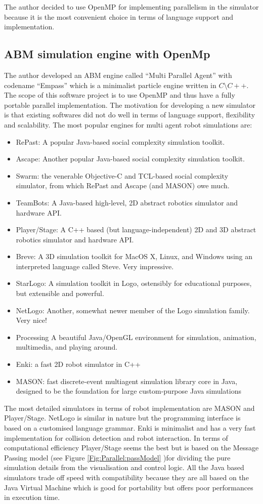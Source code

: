 The author decided to use OpenMP for implementing parallelism in the simulator
because it is the most convenient choice in terms of language support and
implementation.
\subsection{ABM simulation engine with OpenMp}
The author developed an ABM engine called ``Multi Parallel Agent'' with codename
``Empass'' which is a minimalist particle engine written in $C \setminus C++$.
The scope of this software project is to use OpenMP and thus have a fully
portable parallel implementation.
The motivation for developing a new simulator is that existing softwares did not
do well in terms of language support, flexibility and scalability.
The most popular engines for multi agent robot simulations are:

\begin{itemize}
\item RePast: A popular Java-based social complexity simulation toolkit.
\item Ascape: Another popular Java-based social complexity simulation toolkit.
\item Swarm: the venerable Objective-C and TCL-based social complexity simulator,
      from which RePast and Ascape (and MASON) owe much.
\item TeamBots: A Java-based high-level, 2D abstract robotics simulator and
      hardware API.
\item Player/Stage: A C++ based (but language-independent) 2D and 3D abstract
      robotics simulator and hardware API.
\item Breve: A 3D simulation toolkit for MacOS X, Linux, and Windows using
      an interpreted language called Steve. Very impressive.
\item StarLogo: A simulation toolkit in Logo, ostensibly for educational purposes,
      but extensible and powerful.
\item NetLogo: Another, somewhat newer member of the Logo simulation family. Very nice!
\item Processing A beautiful Java/OpenGL environment for simulation, animation,
      multimedia, and playing around.
\item Enki: a fast 2D robot simulator in C++
\item MASON: fast discrete-event multiagent simulation library core in Java,
      designed to be the foundation for large custom-purpose Java simulations
\end{itemize}
The most detailed simulators in terms of robot implementation are MASON and
Player/Stage.
NetLogo is similar in nature but the programming interface is based on a
customised language grammar.
Enki is minimalist and has a very fast implementation for collision detection
and robot interaction.
In terms of computational efficiency Player/Stage seems the best but is based
on the Message Passing model (see Figure \ref{Fig:Parallel:passModel} )for dividing
the pure simulation details from the visualisation and control logic.
All the Java based simulators trade off speed with compatibility because
they are all based on the Java Virtual Machine which is good for portability
but offers poor performances in execution time.


